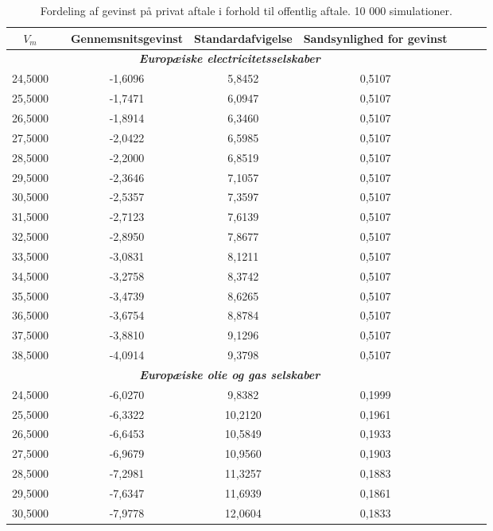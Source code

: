 \documentclass{article}
\begin{document}
\begin{table}[h]
	\caption{Fordeling af gevinst p\aa{} privat aftale i forhold til offentlig aftale. 10 000 simulationer.}
	\label{tab:rel_fordeling}
\begin{center}
	\begin{tabular}{cXcccccr}
	\toprule[1pt]
	$V_m$ && Gennemsnitsgevinst & Standardafvigelse & Sandsynlighed for gevinst\\
	\hline
\multicolumn{5}{c}{\emph{\textbf{Europæiske electricitetsselskaber}}} \\ 
24{,}5000&&-1{,}6096& 5{,}8452& 0{,}5107\\
25{,}5000&&-1{,}7471& 6{,}0947& 0{,}5107\\
26{,}5000&&-1{,}8914& 6{,}3460& 0{,}5107\\
27{,}5000&&-2{,}0422& 6{,}5985& 0{,}5107\\
28{,}5000&&-2{,}2000& 6{,}8519& 0{,}5107\\
29{,}5000&&-2{,}3646& 7{,}1057& 0{,}5107\\
30{,}5000&&-2{,}5357& 7{,}3597& 0{,}5107\\
31{,}5000&&-2{,}7123& 7{,}6139& 0{,}5107\\
32{,}5000&&-2{,}8950& 7{,}8677& 0{,}5107\\
33{,}5000&&-3{,}0831& 8{,}1211& 0{,}5107\\
34{,}5000&&-3{,}2758& 8{,}3742& 0{,}5107\\
35{,}5000&&-3{,}4739& 8{,}6265& 0{,}5107\\
36{,}5000&&-3{,}6754& 8{,}8784& 0{,}5107\\
37{,}5000&&-3{,}8810& 9{,}1296& 0{,}5107\\
38{,}5000&&-4{,}0914& 9{,}3798& 0{,}5107\\
\multicolumn{5}{c}{\emph{\textbf{Europæiske olie og gas selskaber}}} \\
24{,}5000&&-6{,}0270& 9{,}8382& 0{,}1999\\
25{,}5000&&-6{,}3322&10{,}2120& 0{,}1961\\
26{,}5000&&-6{,}6453&10{,}5849& 0{,}1933\\
27{,}5000&&-6{,}9679&10{,}9560& 0{,}1903\\
28{,}5000&&-7{,}2981&11{,}3257& 0{,}1883\\
29{,}5000&&-7{,}6347&11{,}6939& 0{,}1861\\
30{,}5000&&-7{,}9778&12{,}0604& 0{,}1833\\

\end{tabular}
\end{center}
\end{table}
\end{document}
